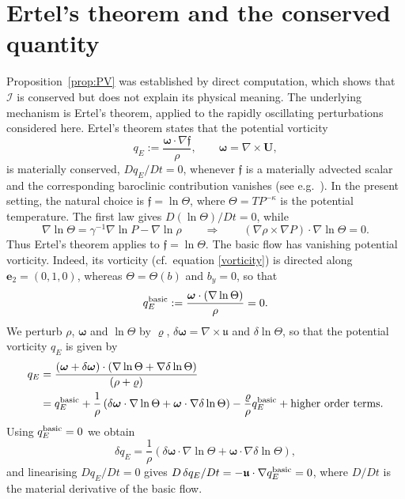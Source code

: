 \documentclass[reqno]{amsart}
\newcommand{\uu}{\boldsymbol{\mathfrak{u}}}             %
\newcommand{\bu}{\mathbf{U}}             %
\begin{document}
\section{Ertel's theorem and the conserved quantity}\label{app:PV}
Proposition~\ref{prop:PV} was established by direct computation, which shows that $\mathcal I$ is conserved but does not explain its physical meaning. The underlying mechanism is Ertel's theorem, applied to the rapidly oscillating perturbations considered here. Ertel's theorem states that the potential vorticity
\begin{equation}
q_E:=\frac{\boldsymbol\omega\cdot\nabla \mathfrak{f}}{\rho},
\qquad
\boldsymbol\omega=\nabla\times\bu,
\end{equation}
is materially conserved, $Dq_E/Dt=0$, whenever $\mathfrak{f}$ is a materially advected scalar and the corresponding baroclinic contribution vanishes (see e.g.\ \cite{Muller1995, Viudez1999}). In the present setting, the natural choice is $\mathfrak{f}=\ln\Theta$, where $\Theta=TP^{-\kappa}$ is the potential temperature. The first law gives $D(\ln\Theta)/Dt=0$, while
\begin{equation}
\nabla\ln\Theta=\gamma^{-1}\nabla\ln P-\nabla\ln\rho\qquad \Longrightarrow\qquad
(\nabla\rho\times\nabla P)\cdot\nabla\ln\Theta=0.
\end{equation}
Thus Ertel's theorem applies to $\mathfrak{f}=\ln\Theta$. The basic flow has vanishing potential vorticity. Indeed, its vorticity (cf.\ equation \eqref{vorticity}) is directed along $\mathbf e_2=(0,1,0)$, whereas $\Theta=\Theta(b)$ and $b_y=0$, so that
\begin{equation}\label{eq:PVbasic}
q_E^{\rm basic}:=
\frac{\boldsymbol\omega\cdot(\nabla\ln\Theta)}{\rho}=0.
\end{equation}
We perturb $\rho$, $\boldsymbol\omega$ and $\ln\Theta$ by $\varrho$, $\delta\boldsymbol\omega=\nabla\times\uu$ and $\delta\ln\Theta$, so that the potential vorticity $q_E$ is given by
\begin{equation}
    \begin{aligned}q_E&=\frac{(\boldsymbol\omega+\delta\boldsymbol\omega)\cdot(\nabla\ln\Theta+\nabla\delta\ln\Theta)}{(\rho+\varrho)}\\
    &=q_E^{\rm basic}+\frac1\rho\left(
\delta\boldsymbol\omega\cdot\nabla\ln\Theta
+
\boldsymbol\omega\cdot\nabla\delta\ln\Theta
\right)-\frac{\varrho}{\rho}q_E^{\rm basic}+ \text{higher order terms}.\end{aligned}
\end{equation}
Using $q_E^{\rm basic}=0$ we obtain
\begin{equation}
\delta q_E
=
\frac1\rho\left(
\delta\boldsymbol\omega\cdot\nabla\ln\Theta
+
\boldsymbol\omega\cdot\nabla\delta\ln\Theta
\right),
\end{equation}
and linearising $Dq_E/Dt=0$ gives $D\,\delta q_E/Dt=-\uu\cdot\nabla q_E^{\rm basic}=0$, where $D/Dt$ is the material derivative of the basic flow.
\end{document}
